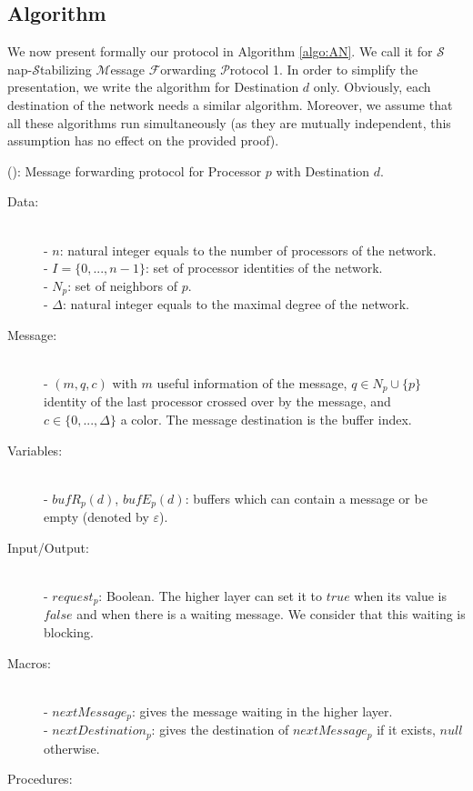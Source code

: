 \documentclass[11pt]{article}
\begin{document}
\subsection{Algorithm}

We now present formally our protocol in Algorithm \ref{algo:AN}. We call it \AN for $\mathcal{S}$nap-$\mathcal{S}$tabilizing $\mathcal{M}$essage $\mathcal{F}$orwarding $\mathcal{P}$rotocol 1. In order to simplify the presentation, we write the algorithm for Destination $d$ only. Obviously, each destination of the network needs a similar algorithm. Moreover, we assume that all these algorithms run simultaneously (as they are mutually independent, this assumption has no effect on the provided proof).

\begin{algorithm}
\caption{\label{algo:AN}(\AN): Message forwarding protocol for Processor $p$ with Destination $d$.}
\small{
\begin{description}
\item [Data:] ~\\
- $n$: natural integer equals to the number of processors of the network.\\
- $I=\{0,...,n-1\}$: set of processor identities of the network.\\
- $N_{p}$: set of neighbors of $p$.\\
- $\Delta$: natural integer equals to the maximal degree of the network.
\item [Message:] ~\\
- $(m,q,c)$ with $m$ useful information of the message, $q\in N_{p}\cup\{p\}$ identity of the last processor crossed over by the message, and $c\in\{0,...,\Delta\}$ a color. The message destination is the buffer index.
\item [Variables:] ~\\
- $bufR_{p}(d)$, $bufE_{p}(d)$: buffers which can contain a message or be empty (denoted by $\varepsilon$).
\item [Input/Output:] ~\\
- $request_{p}$: Boolean. The higher layer can set it to $true$ when its value is $false$ and when there is a waiting message. We consider that this waiting is blocking.
\item [Macros:] ~\\
- $nextMessage_{p}$: gives the message waiting in the higher layer.\\
- $nextDestination_{p}$: gives the destination of $nextMessage_{p}$ if it exists, $null$ otherwise.
\item [Procedures:] ~\\

\end{description}}
\end{algorithm}
\end{document}
